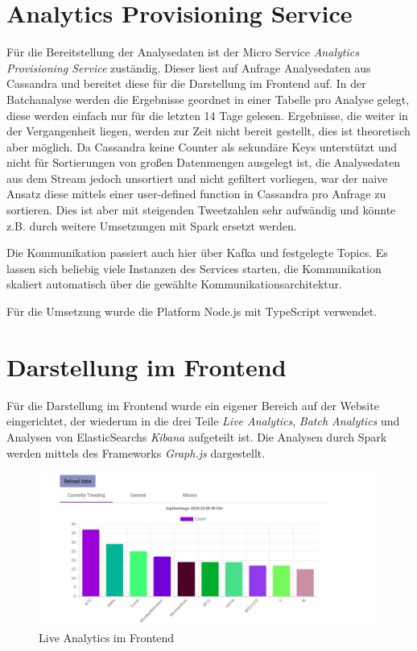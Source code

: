 


\section{Analytics Provisioning Service}

Für die Bereitstellung der Analysedaten ist der Micro Service \textit{Analytics Provisioning Service} zuständig. 
Dieser liest auf Anfrage Analysedaten aus Cassandra und bereitet diese für die Darstellung im Frontend auf.
In der Batchanalyse werden die Ergebnisse geordnet in einer Tabelle pro Analyse gelegt, diese werden einfach nur für die letzten 14 Tage gelesen. Ergebnisse, die weiter in der Vergangenheit liegen, werden zur Zeit nicht bereit gestellt, dies ist theoretisch aber möglich.
Da Cassandra keine Counter als sekundäre Keys unterstützt und nicht für Sortierungen von großen Datenmengen ausgelegt ist,
die Analysedaten aus dem Stream jedoch unsortiert und nicht gefiltert vorliegen, war der naive Ansatz diese mittels einer  user-defined function in Cassandra pro Anfrage zu sortieren. Dies ist aber mit steigenden Tweetzahlen sehr aufwändig und könnte z.B. durch weitere Umsetzungen mit Spark ersetzt werden.

Die Kommunikation passiert auch hier über Kafka und festgelegte Topics.
Es lassen sich beliebig viele Instanzen des Services starten, die Kommunikation skaliert automatisch über die gewählte Kommunikationsarchitektur.

Für die Umsetzung wurde die Platform Node.js mit TypeScript verwendet. 


\section{Darstellung im Frontend}

Für die Darstellung im Frontend wurde ein eigener Bereich auf der Website eingerichtet, der wiederum in die drei Teile
\textit{Live Analytics}, \textit{Batch Analytics} und Analysen von ElasticSearchs \textit{Kibana} aufgeteilt ist.
Die Analysen durch Spark werden mittels des Frameworks \textit{Graph.js} dargestellt.



\begin{figure}[htbp!]
	\centering
	\includegraphics[width=1.1\textwidth]{pics/analytics/currentlyTrending}
	\caption{Live Analytics im Frontend}
\end{figure}
